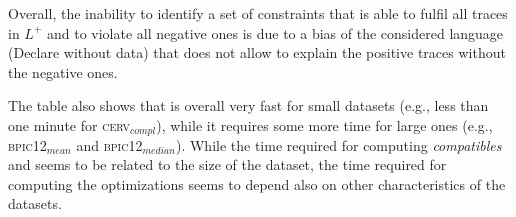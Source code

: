 Overall, the inability to identify a set of constraints that is able to fulfil all traces  in $L^+$ and to violate all negative ones is due to a bias of the considered language (Declare without data) that does not allow to explain the positive traces without the negative ones.


The table also shows that \nd is overall very fast for small datasets (e.g., less than one minute for \textsc{cerv$_{compl}$}), while it requires some more time for large ones (e.g., \textsc{bpic12$_{mean}$} and \textsc{bpic12$_{median}$}). While the time required for computing \textit{compatibles} and \textit{\sheriff} seems to be related to the size of the dataset, the time required for computing the optimizations seems to depend also on other characteristics of the datasets.



